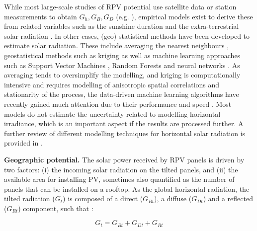 While most large-scale studies of RPV potential use satellite data or station measurements to obtain $G_h, G_B, G_D$ (e.g. \cite{bodis_high-resolution_2019,buffat_scalable_2018,ramirez_camargo_spatio-temporal_2015,calcabrini_simplified_2019}), empirical models exist to derive these from related variables such as the sunshine duration and the extra-terrestrial solar radiation \cite{assouline_estimation_2017}. 
In other cases, (geo)-statistical methods have been developed to estimate solar radiation. 
These include averaging the nearest neighbours \cite{klauser_solarpotentialanalyse_2016}, geostatistical methods such as kriging \cite{alsamamra_comparative_2009,rehman_spatial_2000} as well as machine learning approaches such as Support Vector Machines \cite{assouline_quantifying_2017}, Random Forests \cite{assouline_large-scale_2018} and neural networks \cite{hocaoglu_hourly_2008,notton_neural_2013,sahin_application_2013}. As averaging tends to oversimplify the modelling, and kriging is computationally intensive and requires modelling of anisotropic spatial correlations and stationarity of the process, the data-driven machine learning algorithms have recently gained much attention due to their performance and speed \cite{kanevski_machine_2009}. 
Most models do not estimate the uncertainty related to modelling horizontal irradiance, which is an important aspect if the results are processed further.
A further review of different modelling techniques for horizontal solar radiation is provided in \cite{zhang_review_2018}.

\textbf{Geographic potential.} The solar power received by RPV panels is driven by two factors: (i) the incoming solar radiation on the tilted panels, and (ii) the available area for installing PV, sometimes also quantified as the number of panels that can be installed on a rooftop. As the global horizontal radiation, the tilted radiation ($G_t$) is composed of a direct ($G_{Bt}$), a diffuse ($G_{Dt}$) and a reflected ($G_{Rt}$) component, such that \cite{assouline_estimation_2017}:

\begin{equation}
\label{eq:POA}
G_{t} = G_{Bt} + G_{Dt} + G_{Rt}
\end{equation}

